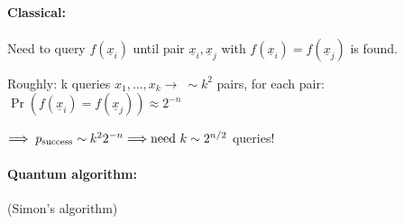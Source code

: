 \documentclass[a4paper, 12pt]{article}
\theoremstyle{plain}
\theoremstyle{definition}
\theoremstyle{remark}
\begin{document}
  \paragraph{Classical:} Need to query $f(\underline{x}_i)$ until pair $\underline{x}_i,\underline{x}_j$ with $f(\underline{x}_i)=f(\underline{x}_j)$ is found.

  Roughly: k queries $x_1,\ldots,x_k \rightarrow\; \sim k^2$ pairs, for each pair: $\Pr(f(\underline{x}_i)=f(\underline{x}_j))\approx 2^{-n}$

  $\Longrightarrow\; p_{\textnormal{success}} \sim k^2 2^{-n} \Longrightarrow \text{need } k \sim 2^{n/2}$ queries!

  \paragraph{Quantum algorithm:} (Simon's algorithm)
\end{document}
